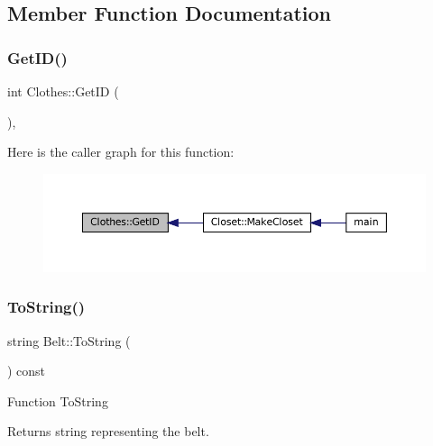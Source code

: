 \subsection{Member Function Documentation}
\mbox{\label{classClothes_a3f6dac172f333126d19010f85ec44e4c}} 
\subsubsection{\texorpdfstring{Get\+I\+D()}{GetID()}}
{\footnotesize\ttfamily int Clothes\+::\+Get\+ID (\begin{DoxyParamCaption}{ }\end{DoxyParamCaption})\hspace{0.3cm}{\ttfamily [inline]}, {\ttfamily [inherited]}}

Here is the caller graph for this function\+:\nopagebreak
\begin{figure}[H]
\begin{center}
\leavevmode
\includegraphics[width=350pt]{classClothes_a3f6dac172f333126d19010f85ec44e4c_icgraph}
\end{center}
\end{figure}
\mbox{\label{classBelt_af09e2b5e51b7603ec5dede2e6b0a753f}} 
\subsubsection{\texorpdfstring{To\+String()}{ToString()}}
{\footnotesize\ttfamily string Belt\+::\+To\+String (\begin{DoxyParamCaption}{ }\end{DoxyParamCaption}) const\hspace{0.3cm}{\ttfamily [virtual]}}

Function \textquotesingle{}To\+String\textquotesingle{} \begin{DoxyReturn}{Returns}
\textquotesingle{}string\textquotesingle{} representing the belt. 
\end{DoxyReturn}


